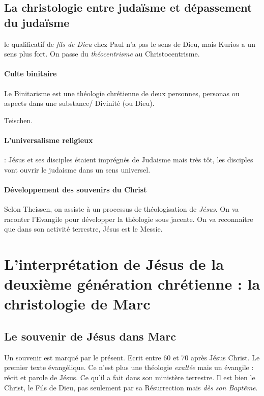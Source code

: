     \subsection{La christologie entre judaïsme et dépassement du judaïsme}
     
   le qualificatif de \textit{fils de Dieu} chez Paul n'a pas le sens de Dieu, mais Kurios a un sens plus fort.  On passe du \textit{théocentrisme} au Christocentrisme. 
   
   \paragraph{Culte binitaire}
   \begin{Def}[binitaire]
   Le Binitarisme est une théologie chrétienne de deux personnes, personas ou aspects dans une substance/ Divinité (ou Dieu).
   
   \end{Def}
   Teischen.
   \paragraph{L'universalisme religieux} : Jésus et ses disciples étaient imprégnés de Judaisme mais très tôt, les disciples vont ouvrir le judaisme dans un sens universel.
   
   \paragraph{Développement des souvenirs du Christ} 

Selon Theissen, on assiste à un processus de théologisation de \textit{Jésus}. On va raconter l'Evangile pour développer la théologie sous jacente. On va reconnaitre que dans son activité terrestre, Jésus est le Messie.   
  \
  \section{L'interprétation de Jésus de la deuxième génération
  chrétienne : la christologie de
  Marc}


     
    \subsection{Le souvenir de Jésus dans Marc}
     
   Un souvenir est marqué par le présent. Ecrit entre 60 et 70 après Jésus Christ. Le premier texte évangélique. Ce n'est plus une théologie \textit{exaltée} mais un évangile : récit et parole de Jésus. Ce qu'il a fait dans son ministère terrestre. Il est bien le Christ, le Fils de Dieu, pas seulement par sa Résurrection mais \textit{dès son Baptême}. 
     
